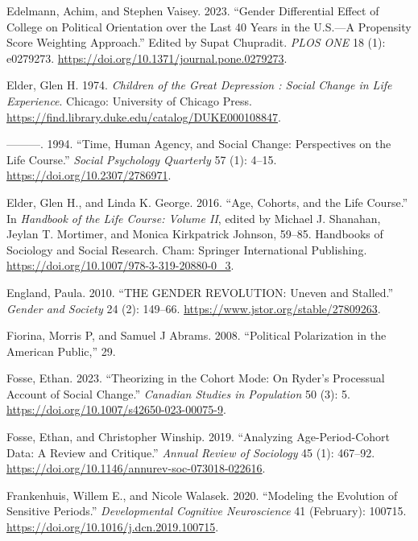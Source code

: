 \documentclass[
  12pt,
]{article}
\newlength{\cslhangindent}
\newlength{\cslentryspacingunit} %
\newenvironment{CSLReferences}[2] %
 {%
  \setlength{\parindent}{0pt}
  \ifodd #1
  \let\oldpar\par
  \def\par{\hangindent=\cslhangindent\oldpar}
  \fi
  \setlength{\parskip}{#2\cslentryspacingunit}
 }%
 {}
\begin{document}
\begin{CSLReferences}{1}{0}
\leavevmode{}%
Edelmann, Achim, and Stephen Vaisey. 2023. {``Gender Differential Effect of College on Political Orientation over the Last 40 Years in the {U}.{S}.---{A} Propensity Score Weighting Approach.''} Edited by Supat Chupradit. \emph{PLOS ONE} 18 (1): e0279273. \url{https://doi.org/10.1371/journal.pone.0279273}.

\leavevmode{}%
Elder, Glen H. 1974. \emph{Children of the {Great} {Depression} : Social Change in Life Experience}. Chicago: University of Chicago Press. \url{https://find.library.duke.edu/catalog/DUKE000108847}.

\leavevmode{}%
---------. 1994. {``Time, {Human} {Agency}, and {Social} {Change}: {Perspectives} on the {Life} {Course}.''} \emph{Social Psychology Quarterly} 57 (1): 4--15. \url{https://doi.org/10.2307/2786971}.

\leavevmode{}%
Elder, Glen H., and Linda K. George. 2016. {``Age, {Cohorts}, and the {Life} {Course}.''} In \emph{Handbook of the {Life} {Course}: {Volume} {II}}, edited by Michael J. Shanahan, Jeylan T. Mortimer, and Monica Kirkpatrick Johnson, 59--85. Handbooks of {Sociology} and {Social} {Research}. Cham: Springer International Publishing. \url{https://doi.org/10.1007/978-3-319-20880-0_3}.

\leavevmode{}%
England, Paula. 2010. {``{THE} {GENDER} {REVOLUTION}: {Uneven} and {Stalled}.''} \emph{Gender and Society} 24 (2): 149--66. \url{https://www.jstor.org/stable/27809263}.

\leavevmode{}%
Fiorina, Morris P, and Samuel J Abrams. 2008. {``Political {Polarization} in the {American} {Public},''} 29.

\leavevmode{}%
Fosse, Ethan. 2023. {``Theorizing in the {Cohort} {Mode}: {On} {Ryder}'s {Processual} {Account} of {Social} {Change}.''} \emph{Canadian Studies in Population} 50 (3): 5. \url{https://doi.org/10.1007/s42650-023-00075-9}.

\leavevmode{}%
Fosse, Ethan, and Christopher Winship. 2019. {``Analyzing {Age}-{Period}-{Cohort} {Data}: {A} {Review} and {Critique}.''} \emph{Annual Review of Sociology} 45 (1): 467--92. \url{https://doi.org/10.1146/annurev-soc-073018-022616}.

\leavevmode{}%
Frankenhuis, Willem E., and Nicole Walasek. 2020. {``Modeling the Evolution of Sensitive Periods.''} \emph{Developmental Cognitive Neuroscience} 41 (February): 100715. \url{https://doi.org/10.1016/j.dcn.2019.100715}.


\end{CSLReferences}
\end{document}
